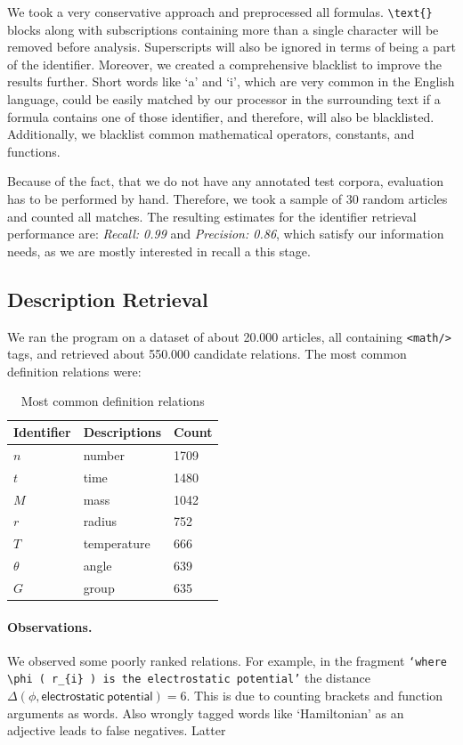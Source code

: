 \documentclass[runningheads]{llncs}
\begin{document}
We took a very conservative approach and preprocessed all formulas.
\texttt{\textbackslash text\{\}} blocks along with subscriptions containing
more than a single character will be removed before analysis. Superscripts
will also be ignored in terms of being a part of the identifier. Moreover, we
created a comprehensive blacklist to improve the results further. Short words
like `a' and `i', which are very common in the English language, could be
easily matched by our processor in the surrounding text if a formula contains
one of those identifier, and therefore, will also be blacklisted. Additionally,
we blacklist common mathematical operators, constants, and functions.

Because of the fact, that we do not have any annotated test corpora,
evaluation has to be performed by hand. Therefore, we took a sample of 30
random articles and counted all matches. The resulting estimates for the
identifier retrieval performance are: \emph{Recall: 0.99} and \emph{Precision:
0.86}, which satisfy our information needs, as we are mostly interested in recall
a this stage.


\subsection{Description Retrieval}
We ran the program on a dataset of about 20.000 articles, all containing
\texttt{<math/>} tags, and retrieved about 550.000 candidate relations. The
most common definition relations were:


\begin{table}[H]
	\begin{center}
	\begin{tabular}{| l | p{6.8cm} | l |}
		\hline
		Identifier & Descriptions & Count\\
		\hline
		$n$ & number & 1709 \\
		$t$ & time & 1480 \\
		$M$ & mass & 1042 \\
		$r$ & radius & 752 \\
		$T$ & temperature & 666 \\
		$\theta$ & angle & 639 \\
		$G$ & group & 635 \\
		\hline
	\end{tabular}
	\end{center}
\caption{Most common definition relations}
\end{table}


\paragraph{Observations.} We observed some poorly ranked relations. For
example, in the fragment \texttt{`where $\phi$ ( $r_{i}$ ) is the electrostatic
potential'} the distance
$\Delta(\phi, \mathsf{electrostatic\:potential} ) = 6$. This is due
to counting brackets and function arguments as words. Also wrongly tagged
words like `Hamiltonian' as an adjective leads to false negatives. Latter
\end{document}
